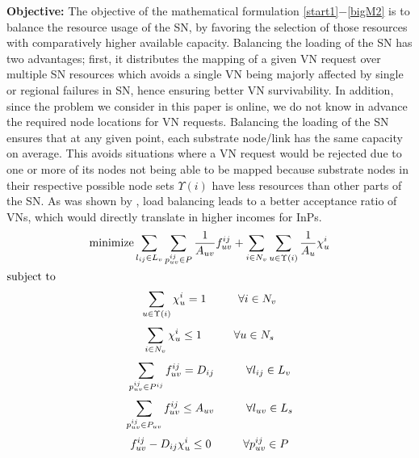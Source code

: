 \documentclass[journal]{IEEEtran}
\def\Min{{\rm minimize }}
\def\ST{{\rm subject\ to}}
\begin{document}
\textbf{Objective:} The objective of the mathematical formulation \eqref{start1}$-$\eqref{bigM2} is to balance the resource usage of the \ac{SN}, by favoring the selection of those resources with comparatively higher available capacity. Balancing the loading of the \ac{SN} has two advantages; first, it distributes the mapping of a given VN request over multiple \ac{SN} resources which avoids a single VN being majorly affected by single or regional failures in \ac{SN}, hence ensuring better VN survivability. In addition, since the problem we consider in this paper is online, we do not know in advance the required node locations for VN requests. Balancing the loading of the \ac{SN} ensures that at any given point, each substrate node/link has the same capacity on average. This avoids situations where a VN request would be rejected due to one or more of its nodes not being able to be mapped because substrate nodes in their respective possible node sets $\Upsilon(i)$ have less resources than other parts of the \ac{SN}. As was shown by \cite{Chowdhury12}, load balancing leads to a better acceptance ratio of \acp{VN}, which would directly translate in higher incomes for \acp{InP}.
\begin{equation}
\Min \sum_{l_{ij} \in L_v} \sum \limits_{p_{uv}^{ij} \in P}  \frac{1}{A_{uv}}f_{uv}^{ij} + \sum \limits_{i \in N_v} \sum \limits_{u \in \Upsilon(i)} \frac{1}{A_{u}}\chi_{u}^{i}
\label{start1}
\end{equation}
$\ST$
\begin{equation}
\sum \limits_{u \in \Upsilon(i)} \chi_{u}^{i} = 1 \hspace{10 mm}\forall i \in N_v
\label{vir1}
\end{equation}
\begin{equation}
\sum \limits_{i \in N_v} \chi_{u}^{i} \leq 1 \hspace{10 mm}\forall u \in N_s
\label{sub1}
\end{equation}
\begin{equation}
\sum \limits_{p_{uv}^{ij} \in P^{ij}} f_{uv}^{ij} = D_{ij}\hspace{10 mm}\forall l_{ij} \in L_v
\label{dem}
\end{equation}
\begin{equation}
\sum \limits_{p_{uv}^{ij} \in P_{uv}} f_{uv}^{ij}\leq A_{uv}\hspace{10 mm}\forall l_{uv} \in L_s
\label{cap}
\end{equation}
\begin{equation}
{f_{uv}^{ij}} - D_{ij} \chi_{u}^{i}\leq 0\hspace{10 mm}\forall p_{uv}^{ij} \in P
\label{bigM1}
\end{equation}
\end{document}
